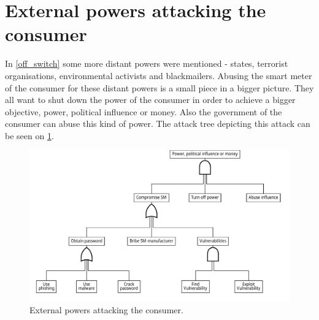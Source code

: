 
\section{External powers attacking the consumer}
In \cref{off_switch} some more distant powers were mentioned - states, terrorist organisations, environmental activists and blackmailers.
Abusing the smart meter of the consumer for these distant powers is a small piece in a bigger picture.
They all want to shut down the power of the consumer in order to achieve a bigger objective, power, political influence or money.
Also the government of the consumer can abuse this kind of power.
The attack tree depicting this attack can be seen on \cref{fig:attack_trees:external}.

\begin{figure}[H]
  \centering
	\includegraphics[width=\textwidth]{figures/graphviz/offswitch.pdf}
	\caption{External powers attacking the consumer.}
	\label{fig:attack_trees:external}
\end{figure}
